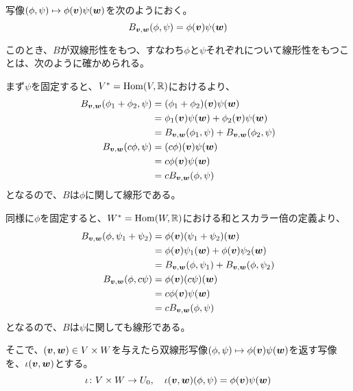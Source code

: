 \documentclass[../../../topic_linear-algebra]{subfiles}
\begin{document}
\br

\begin{handout}[補足:なぜ双線形写像だといえる？]
  写像$(\phi, \psi) \mapsto \phi(\vb*{v}) \psi(\vb*{w})$を次のようにおく。
  \begin{equation*}
    B_{\vb*{v}, \vb*{w}}(\phi, \psi) = \phi(\vb*{v}) \psi(\vb*{w})
  \end{equation*}
  
  このとき、$B$が双線形性をもつ、すなわち$\phi$と$\psi$それぞれについて線形性をもつことは、次のように確かめられる。
  
  \br

  まず$\psi$を固定すると、$V^* = \operatorname{Hom}(V, \mathbb{R})$におけるより、
  \begin{align*}
    B_{\vb*{v}, \vb*{w}}(\phi_1 + \phi_2, \psi) &= (\phi_1 + \phi_2)(\vb*{v}) \psi(\vb*{w}) \\
    &= \phi_1(\vb*{v}) \psi(\vb*{w}) + \phi_2(\vb*{v}) \psi(\vb*{w}) \\
    &= B_{\vb*{v}, \vb*{w}}(\phi_1, \psi) + B_{\vb*{v}, \vb*{w}}(\phi_2, \psi) \\
    B_{\vb*{v}, \vb*{w}}(c\phi, \psi) &= (c\phi)(\vb*{v}) \psi(\vb*{w}) \\
    &= c\phi(\vb*{v}) \psi(\vb*{w}) \\
    &= cB_{\vb*{v}, \vb*{w}}(\phi, \psi)
  \end{align*}
  となるので、$B$は$\phi$に関して線形である。
  
  \br
  
  同様に$\phi$を固定すると、$W^* = \operatorname{Hom}(W, \mathbb{R})$における和とスカラー倍の定義より、
  \begin{align*}
    B_{\vb*{v}, \vb*{w}}(\phi, \psi_1 + \psi_2) &= \phi(\vb*{v}) (\psi_1 + \psi_2)(\vb*{w}) \\
    &= \phi(\vb*{v}) \psi_1(\vb*{w}) + \phi(\vb*{v}) \psi_2(\vb*{w}) \\
    &= B_{\vb*{v}, \vb*{w}}(\phi, \psi_1) + B_{\vb*{v}, \vb*{w}}(\phi, \psi_2) \\
    B_{\vb*{v}, \vb*{w}}(\phi, c\psi) &= \phi(\vb*{v}) (c\psi)(\vb*{w}) \\
    &= c\phi(\vb*{v}) \psi(\vb*{w}) \\
    &= cB_{\vb*{v}, \vb*{w}}(\phi, \psi)
  \end{align*}
  となるので、$B$は$\psi$に関しても線形である。
\end{handout}

そこで、$(\vb*{v}, \vb*{w}) \in V \times W$を与えたら双線形写像$(\phi, \psi) \mapsto \phi(\vb*{v}) \psi(\vb*{w})$を返す写像を、$\iota(\vb*{v}, \vb*{w})$とする。
\begin{equation*}
  \iota \colon V \times W \to U_0, \quad \iota(\vb*{v}, \vb*{w})(\phi, \psi) = \phi(\vb*{v}) \psi(\vb*{w})
\end{equation*}
\end{document}

